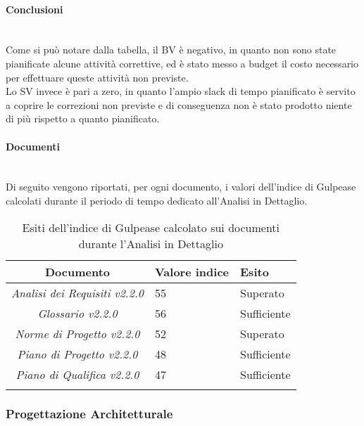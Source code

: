 \paragraph{Conclusioni} \hfill\\
Come si può notare dalla tabella, il BV è negativo, in quanto non sono state pianificate alcune attività correttive, ed è stato messo a budget il costo necessario per effettuare queste attività non previste.\\
Lo SV invece è pari a zero, in quanto l'ampio slack di tempo pianificato è servito a coprire le correzioni non previste e di conseguenza non è stato prodotto niente di più rispetto a quanto pianificato.
\paragraph{Documenti} \hfill\\
Di seguito vengono riportati, per ogni documento, i valori dell'indice di Gulpease calcolati durante il periodo di tempo dedicato all'Analisi in Dettaglio.

\begin{longtable}{|c|p{3cm}|p{3cm}|}
\toprule
\textbf{Documento} & \textbf{Valore indice} & \textbf{Esito} \\


\midrule
\emph{Analisi dei Requisiti v2.2.0} & 55 & Superato \\
\midrule
\emph{Glossario v2.2.0} & 56 & Sufficiente\\
\midrule
\emph{Norme di Progetto v2.2.0} & 52 & Superato\\
\midrule
\emph{Piano di Progetto v2.2.0} & 48 & Sufficiente \\
\midrule
\emph{Piano di Qualifica v2.2.0} & 47 & Sufficiente \\
\bottomrule
\caption{Esiti dell'indice di Gulpease calcolato sui documenti durante l'Analisi in Dettaglio}
\label{tab:changelog}
\end{longtable}

\subsubsection{Progettazione Architetturale}
